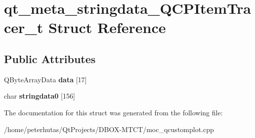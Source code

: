 \hypertarget{structqt__meta__stringdata___q_c_p_item_tracer__t}{}\section{qt\+\_\+meta\+\_\+stringdata\+\_\+\+Q\+C\+P\+Item\+Tracer\+\_\+t Struct Reference}
\label{structqt__meta__stringdata___q_c_p_item_tracer__t}
\subsection*{Public Attributes}
\begin{DoxyCompactItemize}
\item 
\mbox{\label{structqt__meta__stringdata___q_c_p_item_tracer__t_a22eae99e6c4a456148200505b43289b8}} 
Q\+Byte\+Array\+Data {\bfseries data} \mbox{[}17\mbox{]}
\item 
\mbox{\label{structqt__meta__stringdata___q_c_p_item_tracer__t_a716a4a42fdc434d4a1e9e7b141e3715d}} 
char {\bfseries stringdata0} \mbox{[}156\mbox{]}
\end{DoxyCompactItemize}


The documentation for this struct was generated from the following file\+:\begin{DoxyCompactItemize}
\item 
/home/peterhutas/\+Qt\+Projects/\+D\+B\+O\+X-\/\+M\+T\+C\+T/moc\+\_\+qcustomplot.\+cpp\end{DoxyCompactItemize}
